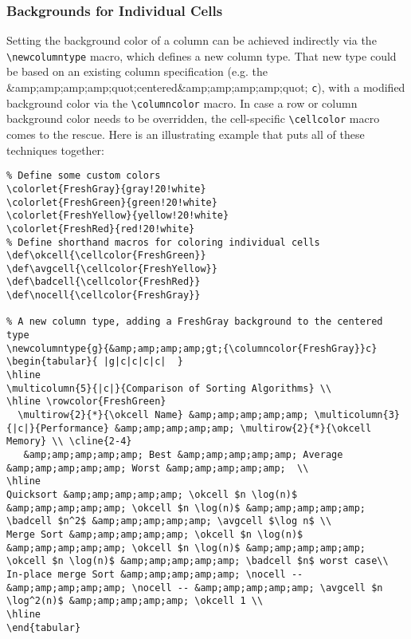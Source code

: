 \subsubsection{Backgrounds for Individual Cells}

Setting the background color of a column can be achieved indirectly via the \verb|\newcolumntype| macro, which defines a new column type. That new type could be based on an existing column specification (e.g. the &amp;amp;amp;amp;quot;centered&amp;amp;amp;amp;quot; \verb|c|), with a modified background color via the \verb|\columncolor| macro. In case a row or column background color needs to be overridden, the cell-specific \verb|\cellcolor| macro comes to the rescue. Here is an illustrating example that puts all of these techniques together:

\begin{lstlisting}
% Define some custom colors
\colorlet{FreshGray}{gray!20!white}
\colorlet{FreshGreen}{green!20!white}
\colorlet{FreshYellow}{yellow!20!white}
\colorlet{FreshRed}{red!20!white}
% Define shorthand macros for coloring individual cells
\def\okcell{\cellcolor{FreshGreen}}
\def\avgcell{\cellcolor{FreshYellow}}
\def\badcell{\cellcolor{FreshRed}}
\def\nocell{\cellcolor{FreshGray}}

% A new column type, adding a FreshGray background to the centered type
\newcolumntype{g}{&amp;amp;amp;amp;gt;{\columncolor{FreshGray}}c}
\begin{tabular}{ |g|c|c|c|c|  }
\hline
\multicolumn{5}{|c|}{Comparison of Sorting Algorithms} \\
\hline \rowcolor{FreshGreen} 
  \multirow{2}{*}{\okcell Name} &amp;amp;amp;amp;amp; \multicolumn{3}{|c|}{Performance} &amp;amp;amp;amp;amp; \multirow{2}{*}{\okcell Memory} \\ \cline{2-4}
   &amp;amp;amp;amp;amp; Best &amp;amp;amp;amp;amp; Average &amp;amp;amp;amp;amp; Worst &amp;amp;amp;amp;amp;  \\
\hline
Quicksort &amp;amp;amp;amp;amp; \okcell $n \log(n)$ &amp;amp;amp;amp;amp; \okcell $n \log(n)$ &amp;amp;amp;amp;amp; \badcell $n^2$ &amp;amp;amp;amp;amp; \avgcell $\log n$ \\
Merge Sort &amp;amp;amp;amp;amp; \okcell $n \log(n)$ &amp;amp;amp;amp;amp; \okcell $n \log(n)$ &amp;amp;amp;amp;amp; \okcell $n \log(n)$ &amp;amp;amp;amp;amp; \badcell $n$ worst case\\
In-place merge Sort &amp;amp;amp;amp;amp; \nocell -- &amp;amp;amp;amp;amp; \nocell -- &amp;amp;amp;amp;amp; \avgcell $n \log^2(n)$ &amp;amp;amp;amp;amp; \okcell 1 \\
\hline
\end{tabular}
\end{lstlisting}

